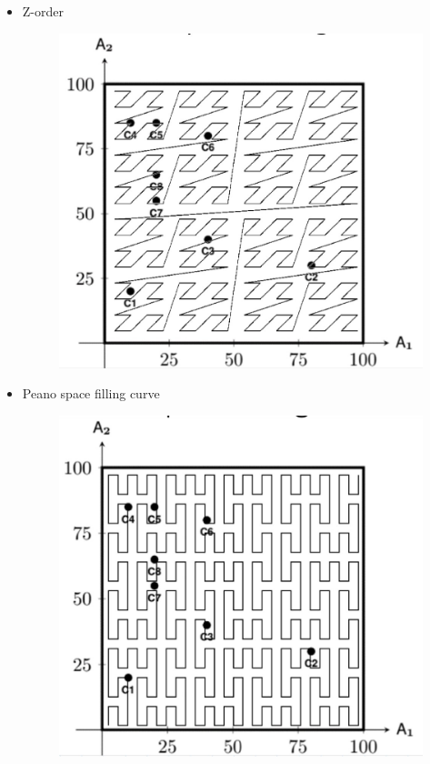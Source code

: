 \begin{itemize}
    \item Z-order

    \begin{figure}[h!]
		\centering
		\includegraphics[scale = 0.7]{img/line3.jpg}
		\label{line3}
    \end{figure}

    \item Peano space filling curve

    \begin{figure}[h!]
		\centering
		\includegraphics[scale = 0.7]{img/line5.jpg}
		\label{line5}
    \end{figure}


\end{itemize}

